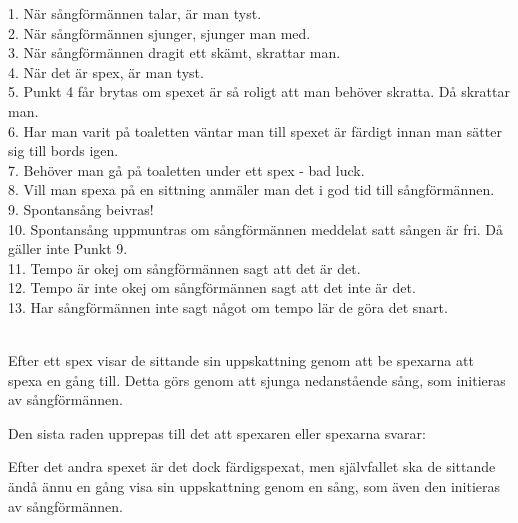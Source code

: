 1. När sångförmännen talar, är man tyst.\\
2. När sångförmännen sjunger, sjunger man med.\\
3. När sångförmännen dragit ett skämt, skrattar man.\\
4. När det är spex, är man tyst.\\
5. Punkt 4 får brytas om spexet är så roligt att man behöver skratta. Då skrattar man.\\
6. Har man varit på toaletten väntar man till spexet är färdigt innan man sätter sig till bords igen.\\
7. Behöver man gå på toaletten under ett spex - bad luck.\\
8. Vill man spexa på en sittning anmäler man det i god tid till sångförmännen.\\
9. Spontansång beivras!\\
10. Spontansång uppmuntras om sångförmännen meddelat satt sången är fri. Då gäller inte Punkt 9.\\
11. Tempo är okej om sångförmännen sagt att det är det.\\
12. Tempo är inte okej om sångförmännen sagt att det inte är det.\\
13. Har sångförmännen inte sagt något om tempo lär de göra det snart.\\
\\


\newpage

Efter ett spex visar de sittande sin uppskattning genom att be spexarna att spexa en gång till.
Detta görs genom att sjunga nedanstående sång, som initieras av sångförmännen.
\\


Den sista raden upprepas till det att spexaren eller spexarna svarar:
\\


Efter det andra spexet är det dock färdigspexat, men självfallet ska de sittande 
ändå ännu en gång visa sin uppskattning genom en sång, som även den initieras av sångförmännen.
\\

